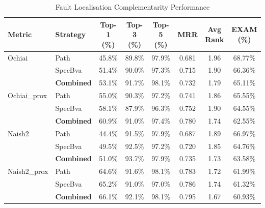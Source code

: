 \begin{table}[htbp]
\centering
\caption{Fault Localisation Complementarity Performance}
\label{tab:complementarity_results}
\begin{tabular}{l l c c c c c c}
\hline
\textbf{Metric} & \textbf{Strategy} & \textbf{Top-1 (\%)} & \textbf{Top-3 (\%)} & \textbf{Top-5 (\%)} & \textbf{MRR} & \textbf{Avg Rank} & \textbf{EXAM (\%)} \\
\hline
Ochiai & Path & 45.8\% & 89.8\% & 97.9\% & 0.681 & 1.96 & 68.77\% \\
 & SpecBva & 51.4\% & 90.0\% & 97.3\% & 0.715 & 1.90 & 66.36\% \\
 & \textbf{Combined} & 53.1\% & 91.7\% & 98.1\% & 0.732 & 1.79 & 65.11\% \\
\hline
Ochiai\_prox & Path & 55.0\% & 90.3\% & 97.2\% & 0.741 & 1.86 & 65.55\% \\
 & SpecBva & 58.1\% & 87.9\% & 96.3\% & 0.752 & 1.90 & 64.55\% \\
 & \textbf{Combined} & 60.9\% & 91.0\% & 97.4\% & 0.780 & 1.74 & 62.55\% \\
\hline
Naish2 & Path & 44.4\% & 91.5\% & 97.9\% & 0.687 & 1.89 & 66.97\% \\
 & SpecBva & 49.5\% & 92.5\% & 97.2\% & 0.720 & 1.85 & 64.76\% \\
 & \textbf{Combined} & 51.0\% & 93.7\% & 97.9\% & 0.735 & 1.73 & 63.58\% \\
\hline
Naish2\_prox & Path & 64.6\% & 91.6\% & 98.1\% & 0.783 & 1.72 & 61.99\% \\
 & SpecBva & 65.2\% & 91.0\% & 97.0\% & 0.786 & 1.74 & 61.32\% \\
 & \textbf{Combined} & 66.1\% & 92.1\% & 98.1\% & 0.795 & 1.67 & 60.93\% \\
\hline
\end{tabular}
\end{table}
